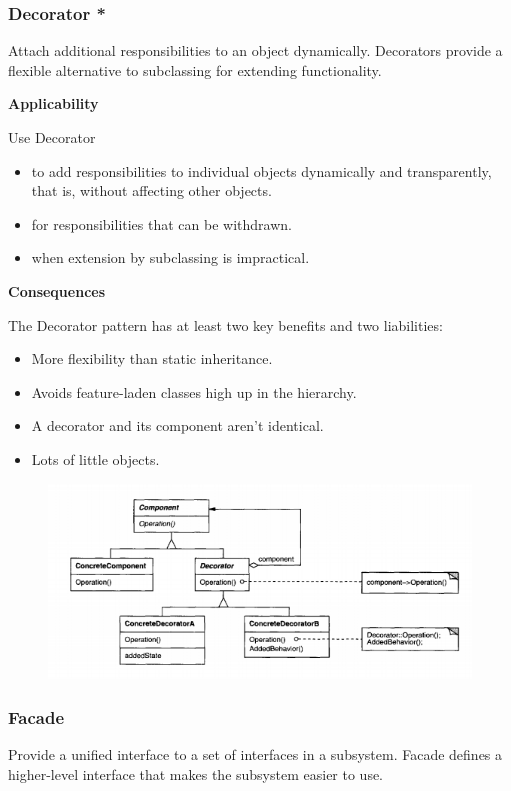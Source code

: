 \documentclass{article}
\begin{document}
\newpage
\subsubsection{Decorator *}
Attach additional responsibilities to an object dynamically. Decorators
provide a flexible alternative to subclassing for extending functionality.

\textbf{Applicability}

Use Decorator
\begin{itemize}
    \item to add responsibilities to individual objects dynamically and transparently, that is, without affecting other objects.
    \item for responsibilities that can be withdrawn.
    \item when extension by subclassing is impractical. 
\end{itemize}

\textbf{Consequences}

The Decorator pattern has at least two key benefits and two liabilities:

\begin{itemize}
    \item More flexibility than static inheritance.
    \item Avoids feature-laden classes high up in the hierarchy.
    \item A decorator and its component aren't identical.
    \item Lots of little objects. 
\end{itemize}

\begin{figure}[h]
    \centering
    \includegraphics[width=14cm]{diagrams/pattern-9-decorator.png}
\end{figure}

\newpage
\subsubsection{Facade}
Provide a unified interface to a set of interfaces in a subsystem. Facade defines a higher-level interface that makes the subsystem easier to use.
\end{document}
